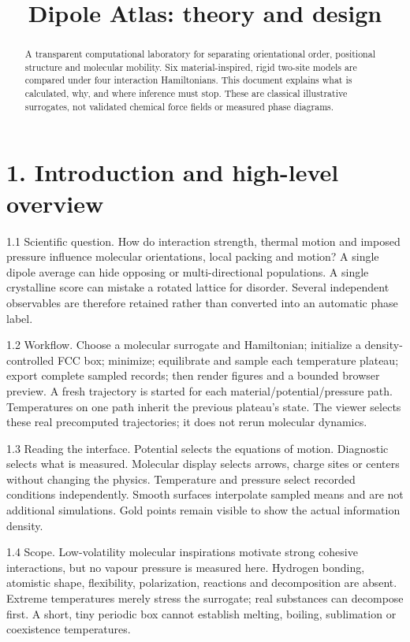 \documentclass[11pt]{article}
\begin{document}
\title{Dipole Atlas: theory and design}\maketitle\tableofcontents
\begin{abstract}
A transparent computational laboratory for separating orientational order, positional structure and molecular mobility. Six material-inspired, rigid two-site models are compared under four interaction Hamiltonians. This document explains what is calculated, why, and where inference must stop. These are classical illustrative surrogates, not validated chemical force fields or measured phase diagrams.
\end{abstract}
\section*{1. Introduction and high-level overview}
1.1 Scientific question. How do interaction strength, thermal motion and imposed pressure influence molecular orientations, local packing and motion? A single dipole average can hide opposing or multi-directional populations. A single crystalline score can mistake a rotated lattice for disorder. Several independent observables are therefore retained rather than converted into an automatic phase label.


1.2 Workflow. Choose a molecular surrogate and Hamiltonian; initialize a density-controlled FCC box; minimize; equilibrate and sample each temperature plateau; export complete sampled records; then render figures and a bounded browser preview. A fresh trajectory is started for each material/potential/pressure path. Temperatures on one path inherit the previous plateau's state. The viewer selects these real precomputed trajectories; it does not rerun molecular dynamics.


1.3 Reading the interface. Potential selects the equations of motion. Diagnostic selects what is measured. Molecular display selects arrows, charge sites or centers without changing the physics. Temperature and pressure select recorded conditions independently. Smooth surfaces interpolate sampled means and are not additional simulations. Gold points remain visible to show the actual information density.


1.4 Scope. Low-volatility molecular inspirations motivate strong cohesive interactions, but no vapour pressure is measured here. Hydrogen bonding, atomistic shape, flexibility, polarization, reactions and decomposition are absent. Extreme temperatures merely stress the surrogate; real substances can decompose first. A short, tiny periodic box cannot establish melting, boiling, sublimation or coexistence temperatures.
\end{document}

